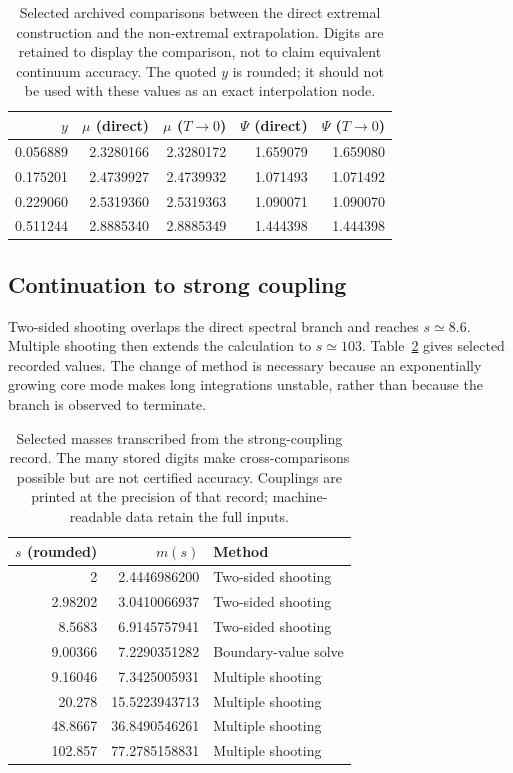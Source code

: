 \documentclass[11pt,a4paper]{article}
\begin{document}
\begin{table}[t]
\centering\small
\begin{tabular}{@{}rrrrr@{}}\toprule
$y$ & $\mu$ (direct) & $\mu$ ($T\to0$) & $\Psi$ (direct) & $\Psi$ ($T\to0$)\\\midrule
0.056889 & 2.3280166 & 2.3280172 & 1.659079 & 1.659080\\
0.175201 & 2.4739927 & 2.4739932 & 1.071493 & 1.071492\\
0.229060 & 2.5319360 & 2.5319363 & 1.090071 & 1.090070\\
0.511244 & 2.8885340 & 2.8885349 & 1.444398 & 1.444398\\\bottomrule
\end{tabular}
\caption{Selected archived comparisons between the direct extremal construction and the non-extremal extrapolation. Digits are retained to display the comparison, not to claim equivalent continuum accuracy. The quoted $y$ is rounded; it should not be used with these values as an exact interpolation node.}
\label{tab:overlap}
\end{table}

\subsection{Continuation to strong coupling}
Two-sided shooting overlaps the direct spectral branch and reaches $s\simeq8.6$. Multiple shooting then extends the calculation to $s\simeq103$. Table~\ref{tab:mass} gives selected recorded values. The change of method is necessary because an exponentially growing core mode makes long integrations unstable, rather than because the branch is observed to terminate.

\begin{table}[t]
\centering\small
\begin{tabular}{@{}rrl@{}}\toprule
$s$ (rounded) & $m(s)$ & Method\\\midrule
2 & 2.4446986200 & Two-sided shooting\\
2.98202 & 3.0410066937 & Two-sided shooting\\
8.5683 & 6.9145757941 & Two-sided shooting\\
9.00366 & 7.2290351282 & Boundary-value solve\\
9.16046 & 7.3425005931 & Multiple shooting\\
20.278 & 15.5223943713 & Multiple shooting\\
48.8667 & 36.8490546261 & Multiple shooting\\
102.857 & 77.2785158831 & Multiple shooting\\\bottomrule
\end{tabular}
\caption{Selected masses transcribed from the strong-coupling record. The many stored digits make cross-comparisons possible but are not certified accuracy. Couplings are printed at the precision of that record; machine-readable data retain the full inputs.}
\label{tab:mass}
\end{table}
\end{document}
